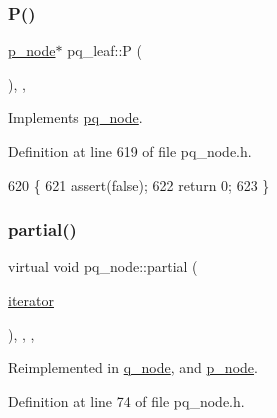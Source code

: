 \subsubsection{\texorpdfstring{P()}{P()}}
{\footnotesize\ttfamily \mbox{\hyperlink{classp__node}{p\+\_\+node}}$\ast$ pq\+\_\+leaf\+::P (\begin{DoxyParamCaption}{ }\end{DoxyParamCaption})\hspace{0.3cm}{\ttfamily [inline]}, {\ttfamily [private]}, {\ttfamily [virtual]}}



Implements \mbox{\hyperlink{classpq__node_a72178a268ee1ece3ac106ac5fea3b12c}{pq\+\_\+node}}.



Definition at line 619 of file pq\+\_\+node.\+h.


\begin{DoxyCode}
620     \{
621     assert(\textcolor{keyword}{false});
622     \textcolor{keywordflow}{return} 0;
623     \}
\end{DoxyCode}
\mbox{\label{classpq__node_aa6830ab47a280f41fe61b7d2f8b508bb}} 
\subsubsection{\texorpdfstring{partial()}{partial()}}
{\footnotesize\ttfamily virtual void pq\+\_\+node\+::partial (\begin{DoxyParamCaption}\item[{\mbox{\hyperlink{classpq__node_a34898c9eb1527787c07e8ebefd6bfba5}{iterator}}}]{ }\end{DoxyParamCaption})\hspace{0.3cm}{\ttfamily [inline]}, {\ttfamily [protected]}, {\ttfamily [virtual]}, {\ttfamily [inherited]}}



Reimplemented in \mbox{\hyperlink{classq__node_a4d17efa229bcea76ffebc92c2e4da3a3}{q\+\_\+node}}, and \mbox{\hyperlink{classp__node_a217e83b61144fe6b64e3fbade0aecfcf}{p\+\_\+node}}.



Definition at line 74 of file pq\+\_\+node.\+h.


